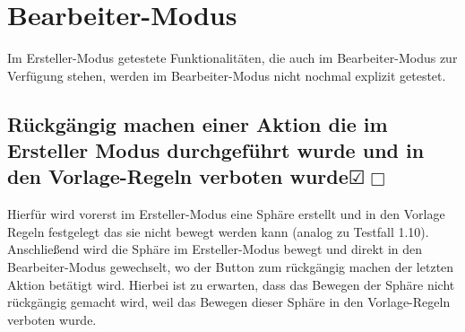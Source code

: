 \documentclass[enabledeprecatedfontcommands]{scrartcl}
\newcommand{\subsectiont}[2]{\subsection[#1]{#1{\normalsize\normalfont #2}}}
\newcommand{\leer}{$\Box$}
\newcommand{\ok}{$\CheckedBox$}
\begin{document}
\section{Bearbeiter-Modus}
Im Ersteller-Modus getestete Funktionalitäten, die auch im Bearbeiter-Modus zur Verfügung stehen, werden im Bearbeiter-Modus nicht nochmal explizit getestet. 

\subsectiont{Rückgängig machen einer Aktion die im Ersteller Modus durchgeführt wurde und in den Vorlage-Regeln verboten wurde}{\dotfill\XBox\ok\leer}
Hierfür wird vorerst im Ersteller-Modus eine Sphäre erstellt und in den Vorlage Regeln festgelegt das sie nicht bewegt werden kann (analog zu Testfall 1.10). Anschließend wird die Sphäre im Ersteller-Modus bewegt und direkt in den Bearbeiter-Modus gewechselt, wo der Button zum rückgängig machen der letzten Aktion betätigt wird. Hierbei ist zu erwarten, dass das Bewegen der Sphäre nicht rückgängig gemacht wird, weil das Bewegen dieser Sphäre in den Vorlage-Regeln verboten wurde. 
\end{document}
